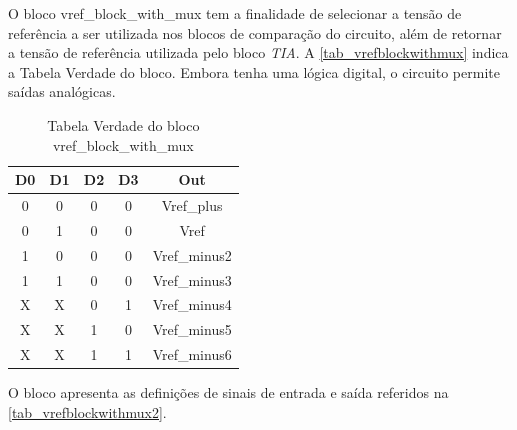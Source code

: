 \renewcommand{\NomeBloco}{vref\_block\_with\_mux}
\renewcommand{\NomeBlocoA}{vrefblockwithmux}
\renewcommand{\NomePTab}{tab_\NomeBlocoA}
\renewcommand{\NomeSTab}{tab_\NomeBlocoA2}
\renewcommand{\NomePFig}{fig_\NomeBlocoA}
\renewcommand{\NomeSFig}{fig_\NomeBlocoA2}
\renewcommand{\NomeTTab}{tab_\NomeBlocoA3}

O bloco \NomeBloco{} tem a finalidade de selecionar a tens\~ao de refer\^encia a ser utilizada nos blocos de compara{\c c}\~ao do circuito, al\'em de retornar a tens\~ao de refer\^encia utilizada pelo bloco \emph{TIA}. A \autoref{\NomePTab} indica a Tabela Verdade do bloco. Embora tenha uma l\'ogica digital, o circuito permite sa\'idas anal\'ogicas.

\begin{table}[htbp]

\caption{Tabela Verdade do bloco \NomeBloco}%
\label{\NomePTab}
\centering
\begin{tabular}{ccccc}
    \toprule
    D0 & D1 & D2 & D3 & Out \\
    \midrule \midrule
    0 & 0 & 0 & 0 & Vref\_plus\\
    \midrule
    0 & 1 & 0 & 0 & Vref\\
    \midrule
    1 & 0 & 0 & 0 & Vref\_minus2\\
    \midrule
    1 & 1 & 0 & 0 & Vref\_minus3\\
    \midrule
    X & X & 0 & 1 & Vref\_minus4\\
    \midrule
    X & X & 1 & 0 & Vref\_minus5\\
    \midrule
    X & X & 1 & 1 & Vref\_minus6\\
\bottomrule

\end{tabular}
\end{table}

O bloco apresenta as defini{\c c}\~oes de sinais de entrada e sa\'ida referidos na \autoref{\NomeSTab}.

